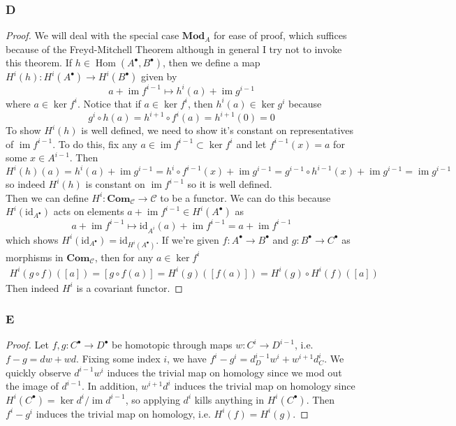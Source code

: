 \documentclass{article}
\newcommand{\id}{\mathrm{id}}
\newcommand{\fC}{\mathscr{C}}
\newcommand{\Mod}{\mathbf{Mod}} %
\newcommand{\Com}{\mathbf{Com}} %
\DeclareMathOperator{\im}{\mathrm{im}}
\DeclareMathOperator{\Hom}{\mathrm{Hom}}
\begin{document}
\subsubsection{D}\label{1.6.D}
\begin{proof}
    We will deal with the special case $\Mod_A$ for ease of proof, which suffices because of the Freyd-Mitchell Theorem although in general I try not to invoke this theorem. If $h\in \Hom(A^\bullet, B^\bullet)$, then we define a map $H^i(h):H^i(A^\bullet)\to H^i(B^\bullet)$ given by
    \[
    a+\im f^{i-1}\mapsto h^i(a) +\im g^{i-1}
    \]
    where $a\in \ker f^i$. Notice that if $a\in \ker f^i$, then $h^i(a)\in \ker g^i$ because 
    \[
    g^i\circ h(a)=h^{i+1}\circ f^i(a)=h^{i+1}(0)=0
    \]
    To show $H^i(h)$ is well defined, we need to show it's constant on representatives of $\im f^{i-1}$. To do this, fix any $a\in \im f^{i-1}\subset \ker f^{i}$ and let $f^{i-1}(x)=a$ for some $x\in A^{i-1}$. Then
    \[
    H^i(h)(a)=h^i(a)+\im g^{i-1}=h^i\circ f^{i-1}(x)+\im g^{i-1}=g^{i-1}\circ h^{i-1}(x)+\im g^{i-1}=\im g^{i-1}
    \]
    so indeed $H^i(h)$ is constant on $\im f^{i-1}$ so it is well defined.\\
    Then we can define $H^i:\Com_\fC \to \fC$ to be a functor. We can do this because $H^i(\id_{A^\bullet})$ acts on elements $a+\im f^{i-1}\in H^i(A^\bullet)$ as
    \[
    a+\im f^{i-1}\mapsto \id_{A^i}(a)+\im f^{i-1}=a+\im f^{i-1}
    \]
    which shows $H^i(\id_{A^\bullet})=\id_{H^i(A^\bullet)}$. If we're given $f:A^\bullet\to B^\bullet$ and $g:B^\bullet\to C^\bullet$ as morphisms in $\Com_\fC$, then for any $a\in \ker f^i$
    \begin{align*}
        H^i(g\circ f)([a])=[g\circ f(a)]=H^i(g)([f(a)])=H^i(g)\circ H^i(f)([a])
    \end{align*}
    Then indeed $H^i$ is a covariant functor.
\end{proof}
\subsubsection{E}\label{1.6.E}
\begin{proof}
    Let $f,g:C^\bullet \to D^\bullet$ be homotopic through maps $w:C^i\to D^{i-1}$, i.e. $f-g = dw+wd$. Fixing some index $i$, we have $f^i-g^i =d_D^{i-1} w^i + w^{i+1} d_C^i$. We quickly observe $d^{i-1} w^i$ induces the trivial map on homology since we mod out the image of $d^{i-1}$. In addition, $w^{i+1} d^i$ induces the trivial map on homology since $H^i(C^\bullet) = \ker d^i/\im d^{i-1}$, so applying $d^i$ kills anything in $H^i(C^\bullet)$. Then $f^i-g^i$ induces the trivial map on homology, i.e. $H^i(f) = H^i(g)$.
\end{proof}
\end{document}
